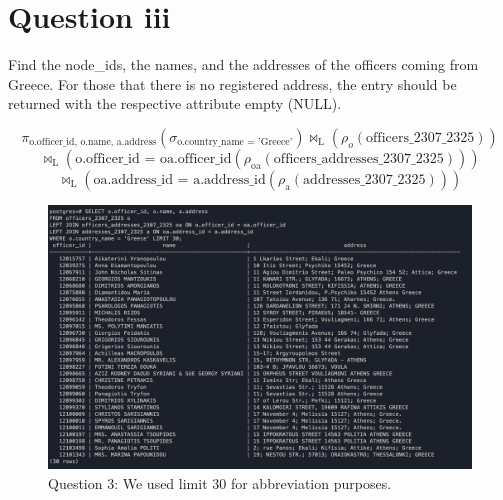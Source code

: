 \documentclass{article}
\begin{document}
\newpage

\section*{Question iii}
Find the node\_ids, the names, and the addresses of the officers coming from Greece. For those that there is no registered address, the entry should be returned with the respective attribute empty (NULL).

\[
    \pi_{\text{{o.officer\_id, o.name, a.address}}}(\sigma_{\text{{o.country\_name = 'Greece'}}}) \bowtie_{\text{L}}(\rho_o(\text{{officers\_2307\_2325}}))
\]
\[
    \bowtie_{\text{L}}({\text{{o.officer\_id = oa.officer\_id}}}  (\text{{\(\rho_{\text{{oa}}}(\text{{officers\_addresses\_2307\_2325}})\)}}))
\]
\[
    \bowtie_{\text{L}}({\text{{oa.address\_id = a.address\_id}}}(\rho_{\text{{a}}}(\text{{addresses\_2307\_2325}})))
\]




\begin{figure}[h]
    \centering
    \includegraphics[width=1\linewidth]{Q3.png}
    \captionsetup{labelformat=empty}
    \caption{Question 3: We used limit 30 for abbreviation purposes.}
\end{figure}

\newpage
\end{document}
